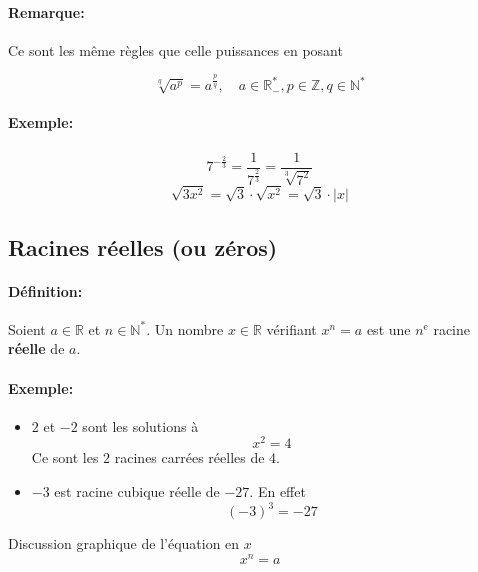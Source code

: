 \documentclass[
    11pt,
    a4paper,
    oneside,
    headinlcude, footinclude,
    twoside,
]{report}
\begin{document}
\paragraph{Remarque:}

Ce sont les même règles que celle puissances en posant 



$$\sqrt[q]{a^{p}} = a ^{\frac{p}{q}}, \quad a \in \mathbb{R}^{*}_{-}, p \in \mathbb{Z},
q \in \mathbb{N}^{*}$$

\paragraph{Exemple:}

$$7^{-\frac{2}{3}} = \frac{1}{7^{\frac{2}{3}}} = \frac{1}{\sqrt[3]{7^{2}}}$$
$$\sqrt{3x^{2}} = \sqrt{3} \cdot \sqrt{x^{2}} = \sqrt{3} \cdot |x|$$

\subsection{Racines réelles (ou zéros)}
\label{sub:racines_reelles_ou_zeros_}

\paragraph{Définition:}

Soient $a \in \mathbb{R}$ et $n \in \mathbb{N}^{*}$. Un nombre $x \in \mathbb{R}$
vérifiant $x^{n} = a$ est une $n^{\text{e}}$ racine \textbf{réelle} de $a$.

\paragraph{Exemple:}

\begin{itemize}
    \item $2$ et $-2$ sont les solutions à $$x^{2} =4$$ 
        Ce sont les $2$ racines carrées réelles de $4$.
    \item $-3$ est racine cubique réelle de $-27$. En effet $$(-3)^{3} = -27$$
\end{itemize}

Discussion graphique de l'équation en $x$ $$x^{n} = a$$
\end{document}
